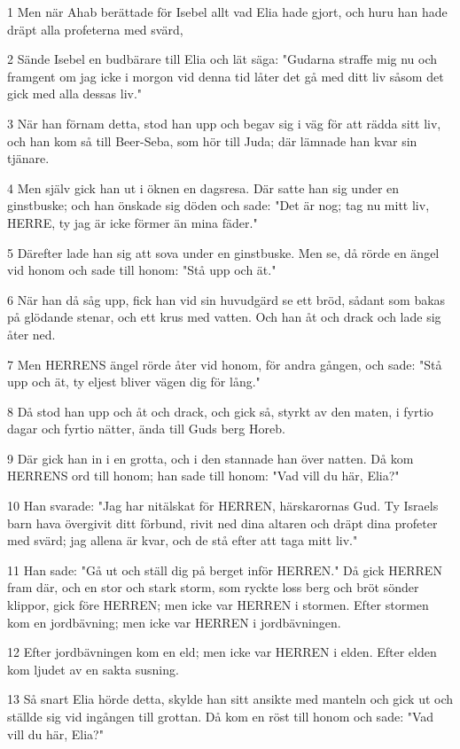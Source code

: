\par 1 Men när Ahab berättade för Isebel allt vad Elia hade gjort, och huru han hade dräpt alla profeterna med svärd,
\par 2 Sände Isebel en budbärare till Elia och lät säga: "Gudarna straffe mig nu och framgent om jag icke i morgon vid denna tid låter det gå med ditt liv såsom det gick med alla dessas liv."
\par 3 När han förnam detta, stod han upp och begav sig i väg för att rädda sitt liv, och han kom så till Beer-Seba, som hör till Juda; där lämnade han kvar sin tjänare.
\par 4 Men själv gick han ut i öknen en dagsresa. Där satte han sig under en ginstbuske; och han önskade sig döden och sade: "Det är nog; tag nu mitt liv, HERRE, ty jag är icke förmer än mina fäder."
\par 5 Därefter lade han sig att sova under en ginstbuske. Men se, då rörde en ängel vid honom och sade till honom: "Stå upp och ät."
\par 6 När han då såg upp, fick han vid sin huvudgärd se ett bröd, sådant som bakas på glödande stenar, och ett krus med vatten. Och han åt och drack och lade sig åter ned.
\par 7 Men HERRENS ängel rörde åter vid honom, för andra gången, och sade: "Stå upp och ät, ty eljest bliver vägen dig för lång."
\par 8 Då stod han upp och åt och drack, och gick så, styrkt av den maten, i fyrtio dagar och fyrtio nätter, ända till Guds berg Horeb.
\par 9 Där gick han in i en grotta, och i den stannade han över natten. Då kom HERRENS ord till honom; han sade till honom: "Vad vill du här, Elia?"
\par 10 Han svarade: "Jag har nitälskat för HERREN, härskarornas Gud. Ty Israels barn hava övergivit ditt förbund, rivit ned dina altaren och dräpt dina profeter med svärd; jag allena är kvar, och de stå efter att taga mitt liv."
\par 11 Han sade: "Gå ut och ställ dig på berget inför HERREN." Då gick HERREN fram där, och en stor och stark storm, som ryckte loss berg och bröt sönder klippor, gick före HERREN; men icke var HERREN i stormen. Efter stormen kom en jordbävning; men icke var HERREN i jordbävningen.
\par 12 Efter jordbävningen kom en eld; men icke var HERREN i elden. Efter elden kom ljudet av en sakta susning.
\par 13 Så snart Elia hörde detta, skylde han sitt ansikte med manteln och gick ut och ställde sig vid ingången till grottan. Då kom en röst till honom och sade: "Vad vill du här, Elia?"
